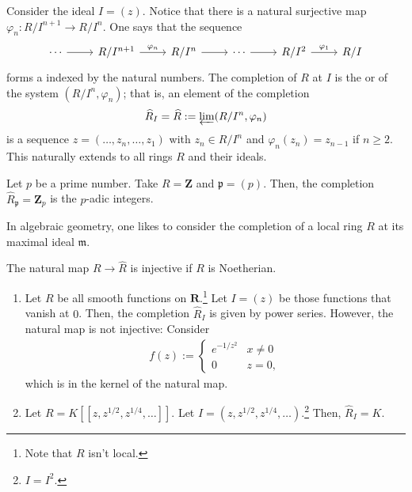 \documentclass [11 pt, oneside] {article}
\begin{document}
Consider the ideal $I=(z)$. Notice that there is a natural surjective map $\varphi_n :R/I^{n+1} \longrightarrow R/I^{n}$. One says that the sequence
\[
\begin{tikzcd}
	\cdots\ar[r] &R/I^{n+1}\ar[r,"\varphi_n"]&R/I^n \ar[r] &\cdots\ar[r] &R/I^2 \ar[r,"\varphi_1"] &R/I 
\end{tikzcd}
\]
forms a  indexed by the natural numbers.
The completion of $R$ at $I$ is the  or  of the system $(R/I^n, \varphi_n)$; that is, an element of the completion
\begin{align*}
	\widehat{R}_I = \widehat{R} := \varprojlim (R/I^n, \varphi_n)
\end{align*}
is a sequence $z=(\hdots, z_n,\hdots,z_1)$ with $z_n\in R/I^n$ and $\varphi_n (z_n)=z_{n-1}$ if $n\ge 2$. This naturally extends to all rings $R$ and their ideals.

\begin{example}[ ]\label{}\text{}
Let $p$ be a prime number. Take $R=\mathbf{Z}$ and $\mathfrak{p}=(p)$. Then, the completion $\widehat{R}_{\mathfrak{p}} = \mathbf{Z}_p$ is the $p$-adic integers.
\end{example}

In algebraic geometry, one likes to consider the completion of a local ring $R$ at its maximal ideal $\mathfrak{m}$.

The natural map $R\longrightarrow \widehat{R}$ is injective if $R$ is Noetherian.

\begin{example}\label{}\text{}
\begin{enumerate}
	\item Let $R$ be all smooth functions on $\mathbf{R}$.\footnote{Note that $R$ isn't local.} Let $I=(z)$ be those functions that vanish at $0$. Then, the completion $\widehat{R}_I$ is given by power series. However, the natural map is not injective: Consider
		\begin{align*}
			f(z):=
			 \begin{cases}
				 e^{-1/z^2}&x\ne 0\\
				 0&z=0,
			\end{cases}
		\end{align*}
		which is in the kernel of the natural map.
	\item Let $R = K [\![z,z^{1/2},z^{1/4},\hdots]\!]$. Let $I=(z,z^{1/2},z^{1/4},\hdots)$.\footnote{$I=I^2$.} Then, $\widehat{R}_I = K$.
\end{enumerate}
\end{example}
\end{document}
